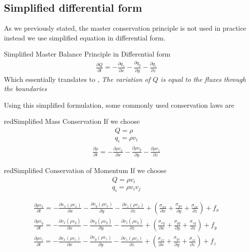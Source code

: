 \documentclass[a4paper, 11pt,article,oneside]{memoir}%
\begin{document}
\subsection{Simplified differential form}
As we previously stated, the master conservation principle is not used in practice instead we use simplified  equation in differential form.
\begin{eqbox2}{}{Simplified  Master Balance Principle in  Differential form}
\begin{gather*}
\frac{\partial Q}{\partial t}=-\frac{\partial q_x}{\partial x}-\frac{\partial q_y}{\partial y}-\frac{\partial q_z}{\partial z}
\end{gather*}
Which essentially translates to , \textit{The variation of $Q$ is equal to the fluxes through the boundaries}
\end{eqbox2}
Using this simplified formulation, some commonly used conservation laws are
\begin{eqbox2}{red}{Simplified Mass Conservation}
If we choose 
\begin{gather*}
Q=\rho \\
q_i=\rho v_i
\end{gather*}
\begin{gather*}
\frac{\partial \rho}{\partial t}=-\frac{\partial \rho v_x}{\partial x}-\frac{\partial \rho v_y}{\partial y}-\frac{\partial \rho v_z}{\partial z}
\end{gather*}
\end{eqbox2}
\begin{eqbox2}{red}{Simplified Conservation of Momentum}
If we choose 
\begin{gather*}
Q=\rho v_i \\
q_i=\rho v_i v_j
\end{gather*}

\begin{align*}
\frac{\partial \rho v_x}{\partial t}=-\frac{\partial v_x( \rho v_x)}{\partial x}-\frac{\partial v_y( \rho v_x)}{\partial y}-\frac{\partial v_z( \rho v_x)}{\partial z}+\left(\frac{\sigma_{xx}}{\partial x}+\frac{\sigma_{yx}}{\partial y}+\frac{\sigma_{zx}}{\partial z}\right)+f_x\\
\frac{\partial \rho v_y}{\partial t}=-\frac{\partial v_x( \rho v_y)}{\partial x}-\frac{\partial v_y( \rho v_y)}{\partial y}-\frac{\partial v_z( \rho v_y)}{\partial z}+\left(\frac{\sigma_{xy}}{\partial x}+\frac{\sigma_{yy}}{\partial y}+\frac{\sigma_{zy}}{\partial z}\right)+f_y\\
\frac{\partial \rho v_z}{\partial t}=-\frac{\partial v_x( \rho v_z)}{\partial x}-\frac{\partial v_y( \rho v_z)}{\partial y}-\frac{\partial v_z( \rho v_z)}{\partial z}+\left(\frac{\sigma_{xz}}{\partial x}+\frac{\sigma_{yz}}{\partial y}+\frac{\sigma_{zz}}{\partial z}\right)+f_z\\
\end{align*}

\end{eqbox2}
\end{document}
